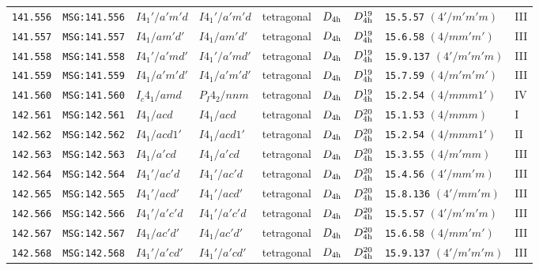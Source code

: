 \documentclass[fleqn,10pt]{jsarticle}
\begin{document}
\begin{center}
\begin{longtable}{lllllllll}
\texttt{141.556} & \texttt{MSG:141.556} & $I4_{1}'/a'm'd$ & $I4_{1}'/a'm'd$ & tetragonal & $D_{\rm 4h}$ & $D_{\rm 4h}^{19}$ & \texttt{15.5.57} $(4'/m'm'm)$ & III \\
\texttt{141.557} & \texttt{MSG:141.557} & $I4_{1}/am'd'$ & $I4_{1}/am'd'$ & tetragonal & $D_{\rm 4h}$ & $D_{\rm 4h}^{19}$ & \texttt{15.6.58} $(4/mm'm')$ & III \\
\texttt{141.558} & \texttt{MSG:141.558} & $I4_{1}'/a'md'$ & $I4_{1}'/a'md'$ & tetragonal & $D_{\rm 4h}$ & $D_{\rm 4h}^{19}$ & \texttt{15.9.137} $(4'/m'm'm)$ & III \\
\texttt{141.559} & \texttt{MSG:141.559} & $I4_{1}/a'm'd'$ & $I4_{1}/a'm'd'$ & tetragonal & $D_{\rm 4h}$ & $D_{\rm 4h}^{19}$ & \texttt{15.7.59} $(4/m'm'm')$ & III \\
\texttt{141.560} & \texttt{MSG:141.560} & $I_{c}4_{1}/amd$ & $P_{I}4_{2}/nnm$ & tetragonal & $D_{\rm 4h}$ & $D_{\rm 4h}^{19}$ & \texttt{15.2.54} $(4/mmm1')$ & IV \\ \hline
\texttt{142.561} & \texttt{MSG:142.561} & $I4_{1}/acd$ & $I4_{1}/acd$ & tetragonal & $D_{\rm 4h}$ & $D_{\rm 4h}^{20}$ & \texttt{15.1.53} $(4/mmm)$ & I \\
\texttt{142.562} & \texttt{MSG:142.562} & $I4_{1}/acd1'$ & $I4_{1}/acd1'$ & tetragonal & $D_{\rm 4h}$ & $D_{\rm 4h}^{20}$ & \texttt{15.2.54} $(4/mmm1')$ & II \\
\texttt{142.563} & \texttt{MSG:142.563} & $I4_{1}/a'cd$ & $I4_{1}/a'cd$ & tetragonal & $D_{\rm 4h}$ & $D_{\rm 4h}^{20}$ & \texttt{15.3.55} $(4/m'mm)$ & III \\
\texttt{142.564} & \texttt{MSG:142.564} & $I4_{1}'/ac'd$ & $I4_{1}'/ac'd$ & tetragonal & $D_{\rm 4h}$ & $D_{\rm 4h}^{20}$ & \texttt{15.4.56} $(4'/mm'm)$ & III \\
\texttt{142.565} & \texttt{MSG:142.565} & $I4_{1}'/acd'$ & $I4_{1}'/acd'$ & tetragonal & $D_{\rm 4h}$ & $D_{\rm 4h}^{20}$ & \texttt{15.8.136} $(4'/mm'm)$ & III \\
\texttt{142.566} & \texttt{MSG:142.566} & $I4_{1}'/a'c'd$ & $I4_{1}'/a'c'd$ & tetragonal & $D_{\rm 4h}$ & $D_{\rm 4h}^{20}$ & \texttt{15.5.57} $(4'/m'm'm)$ & III \\
\texttt{142.567} & \texttt{MSG:142.567} & $I4_{1}/ac'd'$ & $I4_{1}/ac'd'$ & tetragonal & $D_{\rm 4h}$ & $D_{\rm 4h}^{20}$ & \texttt{15.6.58} $(4/mm'm')$ & III \\
\texttt{142.568} & \texttt{MSG:142.568} & $I4_{1}'/a'cd'$ & $I4_{1}'/a'cd'$ & tetragonal & $D_{\rm 4h}$ & $D_{\rm 4h}^{20}$ & \texttt{15.9.137} $(4'/m'm'm)$ & III \\

\end{longtable}
\end{center}
\end{document}
